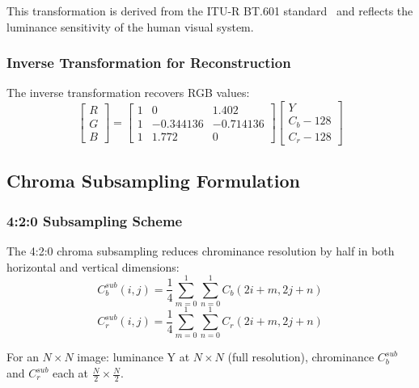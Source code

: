 \documentclass{ipol}
\begin{document}
This transformation is derived from the ITU-R BT.601 standard~\cite{ref69} and reflects
the luminance sensitivity of the human visual system.

\FloatBarrier
\subsubsection{Inverse Transformation for Reconstruction}

The inverse transformation recovers RGB values:
\begin{equation}
\begin{bmatrix} R \\ G \\ B \end{bmatrix} =
\begin{bmatrix}
  1 & 0 & 1.402 \\
  1 & -0.344136 & -0.714136 \\
  1 & 1.772 & 0
\end{bmatrix}
\begin{bmatrix} Y \\ C_b - 128 \\ C_r - 128 \end{bmatrix}
\label{eq:ycbcr_to_rgb}
\end{equation}

\FloatBarrier
\subsection{Chroma Subsampling Formulation}

\FloatBarrier
\subsubsection{4:2:0 Subsampling Scheme}

The 4:2:0 chroma subsampling reduces chrominance resolution by half in both
horizontal and vertical dimensions:
\begin{equation}
C_b^{sub}(i,j) = \frac{1}{4}\sum_{m=0}^{1}\sum_{n=0}^{1} C_b(2i+m, 2j+n)
\label{eq:cb_subsample}
\end{equation}
\begin{equation}
C_r^{sub}(i,j) = \frac{1}{4}\sum_{m=0}^{1}\sum_{n=0}^{1} C_r(2i+m, 2j+n)
\label{eq:cr_subsample}
\end{equation}

For an $N \times N$ image: luminance Y at $N \times N$ (full resolution),
chrominance $C_b^{sub}$ and $C_r^{sub}$ each at $\frac{N}{2} \times \frac{N}{2}$.
\end{document}
